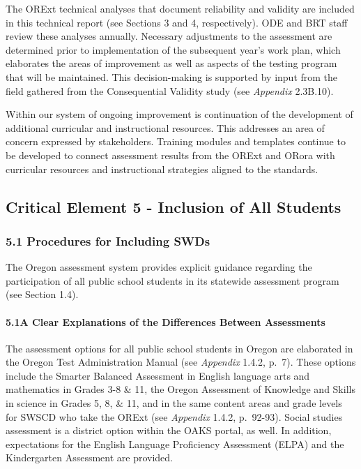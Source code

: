 \documentclass[]{article}
\let\oldparagraph\paragraph
\renewcommand{\paragraph}[1]{\oldparagraph{#1}\mbox{}}
\begin{document}
The ORExt technical analyses that document reliability and validity are
included in this technical report (see Sections 3 and 4, respectively).
ODE and BRT staff review these analyses annually. Necessary adjustments
to the assessment are determined prior to implementation of the
subsequent year's work plan, which elaborates the areas of improvement
as well as aspects of the testing program that will be maintained. This
decision-making is supported by input from the field gathered from the
Consequential Validity study (see \emph{Appendix} 2.3B.10).

Within our system of ongoing improvement is continuation of the
development of additional curricular and instructional resources. This
addresses an area of concern expressed by stakeholders. Training modules
and templates continue to be developed to connect assessment results
from the ORExt and ORora with curricular resources and instructional
strategies aligned to the standards.

\subsection{Critical Element 5 - Inclusion of All
Students}\label{critical-element-5---inclusion-of-all-students}

\subsubsection{5.1 Procedures for Including
SWDs}\label{procedures-for-including-swds}

The Oregon assessment system provides explicit guidance regarding the
participation of all public school students in its statewide assessment
program (see Section 1.4).

\paragraph{5.1A Clear Explanations of the Differences Between
Assessments}\label{a-clear-explanations-of-the-differences-between-assessments}

The assessment options for all public school students in Oregon are
elaborated in the Oregon Test Administration Manual (see \emph{Appendix}
1.4.2, p.~7). These options include the Smarter Balanced Assessment in
English language arts and mathematics in Grades 3-8 \& 11, the Oregon
Assessment of Knowledge and Skills in science in Grades 5, 8, \& 11, and
in the same content areas and grade levels for SWSCD who take the ORExt
(see \emph{Appendix} 1.4.2, p.~92-93). Social studies assessment is a
district option within the OAKS portal, as well. In addition,
expectations for the English Language Proficiency Assessment (ELPA) and
the Kindergarten Assessment are provided.
\end{document}
